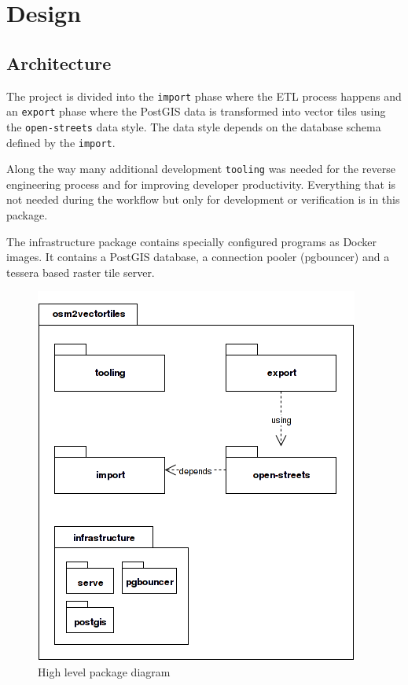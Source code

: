 \chapter{Design}\label{design}

\section{Architecture}

The project is divided into the \texttt{import} phase where
the ETL process  happens and an \texttt{export} phase where the PostGIS data
is transformed into vector tiles using the \texttt{open-streets} data style.
The data style depends on the database schema defined by the \texttt{import}. 


Along the way many additional development \texttt{tooling} was needed for the reverse engineering process and for improving developer productivity. Everything that is not needed during
the workflow but only for development or verification is in this package.


The infrastructure package contains specially configured programs as Docker images.
It contains a PostGIS database, a connection pooler (pgbouncer) and a tessera based raster tile server.

\begin{figure}[h]
  \includegraphics[scale=0.6]{images/high_level_packages.png}
  \caption{High level package diagram}
\end{figure}

